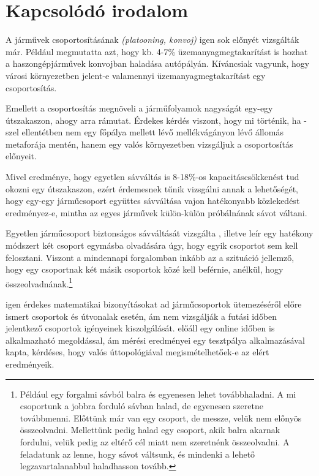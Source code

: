 \documentclass{article}
\begin{document}
	\section{Kapcsolódó irodalom}
		A járművek csoportosításának \emph{(platooning, konvoj)} igen sok előnyét vizsgálták már. Például \cite[Alam et al.]{bib:fuel} megmutatta azt, hogy kb. 4-7\% üzemanyagmegtakarítást is hozhat a haszongépjárművek konvojban haladása autópályán. Kíváncsiak vagyunk, hogy városi környezetben jelent-e valamennyi üzemanyagmegtakarítást egy csoportosítás.
		
		Emellett a csoportosítás megnöveli a járműfolyamok nagyságát egy-egy útszakaszon, ahogy arra \cite[Fernandes]{bib:fernandes} rámutat. Érdekes kérdés viszont, hogy mi történik, ha \cite[Fernandes]{bib:fernandes}-szel ellentétben nem egy főpálya mellett lévő mellékvágányon lévő állomás metaforája mentén, hanem egy valós környezetben vizsgáljuk a csoportosítás előnyeit.
		
		Mivel \cite{bib:LC} eredménye, hogy egyetlen sávváltás is 8-18\%-os kapacitáscsökkenést tud okozni egy útszakaszon, ezért érdemesnek tűnik vizsgálni annak a lehetőségét, hogy egy-egy járműcsoport együttes sávváltása vajon hatékonyabb közlekedést eredményez-e, mintha az egyes járművek külön-külön próbálnának sávot váltani.
		
		Egyetlen járműcsoport biztonságos sávváltását vizsgálta \cite[Hsu és Liu]{bib:kinem}, illetve \cite[Sun et al.]{bib:merging} leír egy hatékony módszert két csoport egymásba olvadására úgy, hogy egyik csoportot sem kell felosztani. Viszont a mindennapi forgalomban inkább az a szituáció jellemző, hogy egy csoportnak két másik csoportok közé kell beférnie, anélkül, hogy összeolvadnának.\footnote{Például egy forgalmi sávból balra és egyenesen lehet továbbhaladni. A mi csoportunk a jobbra forduló sávban halad, de egyenesen szeretne továbbmenni. Előttünk már van egy csoport, de messze, velük nem előnyös összeolvadni. Mellettünk pedig halad egy csoport, akik balra akarnak fordulni, velük pedig az eltérő cél miatt nem szeretnénk összeolvadni. A feladatunk az lenne, hogy sávot váltsunk, és mindenki a lehető legzavartalanabbul haladhasson tovább.}
		
		\cite[Besa Vial et al.]{bib:platSched} igen érdekes matematikai bizonyításokat ad járműcsoportok ütemezéséről előre ismert csoportok és útvonalak esetén, ám nem vizsgálják a futási időben jelentkező csoportok igényeinek kiszolgálását. \cite[Ahmad et al.]{bib:MDDF} előáll egy online időben is alkalmazható megoldással, ám mérési eredményei egy tesztpálya alkalmazásával kapta, kérdéses, hogy valós úttopológiával megismételhetőek-e az elért eredményeik.
		
\end{document}
